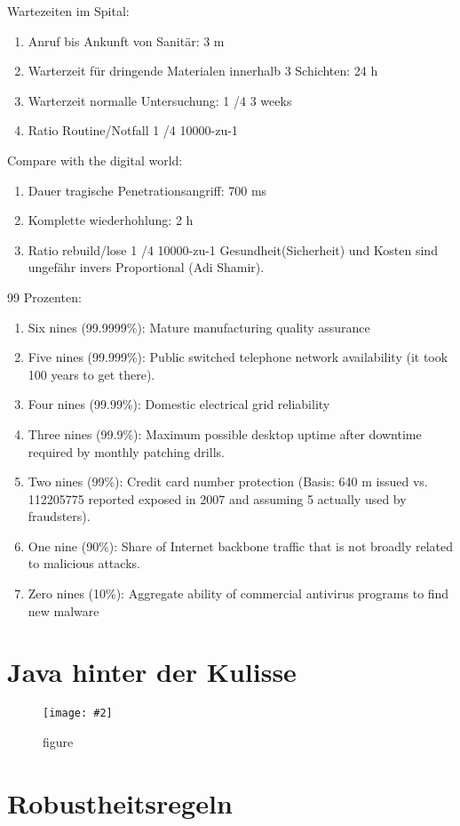 \documentclass[a4paper,10pt]{scrreprt}
\newcommand{\pic}[2][figure]{\begin{figure}[h]
 \centering
 \texttt{[image: \#2]}
 \caption{#1}
\end{figure}
}
\begin{document}
Wartezeiten im Spital:
\begin{enumerate}
\item  Anruf bis Ankunft von Sanitär: 3 m
\item Warterzeit für dringende Materialen innerhalb 3 Schichten: 24 h
\item Warterzeit normalle Untersuchung: 1 \slash 4 3 weeks
\item  Ratio Routine/Notfall 1 \slash 4 10000-zu-1
\end{enumerate}
Compare with the digital world:
\begin{enumerate}
\item Dauer tragische Penetrationsangriff: 700 ms
\item Komplette wiederhohlung: 2 h
\item  Ratio rebuild/lose 1 \slash 4 10000-zu-1 
Gesundheit(Sicherheit) und Kosten sind ungefähr invers Proportional (Adi Shamir).
\end{enumerate}

99 Prozenten:\\
\begin{enumerate}
\item Six nines (99.9999\%): Mature manufacturing quality assurance
\item Five nines (99.999\%): Public switched telephone network availability (it
took 100 years to get there).
\item  Four nines (99.99\%): Domestic electrical grid reliability
\item  Three nines (99.9\%): Maximum possible desktop uptime after downtime
required by monthly patching drills.
\item Two nines (99\%): Credit card number protection (Basis: 640 m issued vs.
112205775 reported exposed in 2007 and assuming 5%
actually used by fraudsters).
\item  One nine (90\%): Share of Internet backbone traffic that is not broadly
related to malicious attacks.
\item  Zero nines (10\%): Aggregate ability of commercial antivirus programs to
find new malware
\end{enumerate}

\section{Java hinter der Kulisse}
\pic{javakul.png}

\section{Robustheitsregeln}
\end{document}
